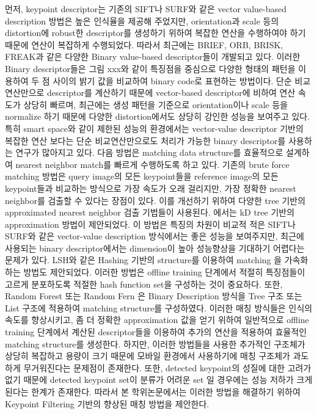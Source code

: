 먼저, keypoint descriptor는 기존의 SIFT\cite{lowe_distinctive_2004}나 SURF\cite{bay_speeded-up_2008}와 같은 vector value-based description 방법은 높은 인식율을 제공해 주었지만, orientation과 scale 등의 distortion에 robust한 descriptor를 생성하기 위하여 복잡한 연산을 수행하여야 하기 때문에 연산이 복잡하게 수행되었다. 따라서 최근에는 BRIEF\cite{calonder_brief:_2010}, ORB\cite{rublee_orb:_2011}, BRISK\cite{leutenegger_brisk:_2011}, FREAK\cite{alahi_freak:_2012}과 같은 다양한 Binary value-based descriptor들이 개발되고 있다. 이러한 Binary descriptor들은 그림 xxx와 같이 특징점을 중심으로 다양한 형태의 패턴을 이용하여 두 점 사이의 밝기 값을 비교하여 binary code로 표현하는 방법이다. 단순 비교 연산만으로 descriptor를 계산하기 때문에 vector-based descriptor에 비하여 연산 속도가 상당히 빠르며, 최근에는 생성 패턴을 기준으로 orientation이나 scale 등을 normalize 하기 때문에 다양한 distortion에서도 상당히 강인한 성능을 보여주고 있다. 특히 smart space와 같이 제한된 성능의 환경에서는 vector-value descriptor 기반의 복잡한 연산 보다는 단순 비교연산만으로도 처리가 가능한 binary descriptor를 사용하는 연구가 많아지고 있다. 
다음 방법은 matching data structure를 효율적으로 설계하여 nearest neighbor match를 빠르게 수행하도록 하고 있다. 기존의 brute force matching 방법은 query image의 모든 keypoint들을  reference image의 모든 keypoint들과 비교하는 방식으로 가장 속도가 오래 걸리지만, 가장 정확한 nearest neighbor를 검출할 수 있다는 장점이 있다. 이를 개선하기 위하여 다양한 tree 기반의 approximated nearest neighbor 검출 기법들이 사용된다. \cite{beis_shape_1997}에서는 kD tree 기반의 approximation 방법이 제안되었다. 이 방법은 특징의 차원이 비교적 적은 SIFT나 SURF와 같은  vector-value description 방식에서는 좋은 성능을 보여주지만, 최근에 사용되는 binary descriptor에서는 dimension이 높아 성능향상을 기대하기 어렵다는 문제가 있다. LSH\cite{gionis_similarity_1999}와 같은 Hashing 기반의 structure를 이용하여 matching 을 가속화하는 방법도 제안되었다\cite{rublee_orb:_2011}. 이러한 방법은 offline training 단계에서 적절히 특징점들이 고르게 분포하도록 적절한 hash function set을 구성하는 것이 중요하다. 또한, Random Forest\cite{lepetit_keypoint_2006} 또는 Random Fern \cite{ozuysal_fast_2010}은 Binary Description 방식을 Tree 구조 또는 List 구조에 적용하여 matching structure를 구성하였다. 이러한 매칭 방식들은 인식의 속도를 향상시키고, 좀 더 정확한 approximation 값을 얻기 위하여 일반적으로 offline training 단계에서 계산된 descriptor들을 이용하여 추가의 연산을 적용하여 효율적인 matching structure를 생성한다. 하지만, 이러한 방법들을 사용한 추가적인 구조체가 상당히 복잡하고 용량이 크기 때문에 모바일 환경에서 사용하기에 매칭 구조체가 과도하게 무거워진다는 문제점이 존재한다. 또한, detected keypoint의 성질에 대한 고려가 없기 때문에 detected keypoint set이 분류가 어려운 set 일 경우에는 성능 저하가 크게 된다는 한계가 존재한다. 따라서 본 학위논문에서는 이러한 방법을 해결하기 위하여 Keypoint Filtering 기반의 향상된 매칭 방법을 제안한다.
